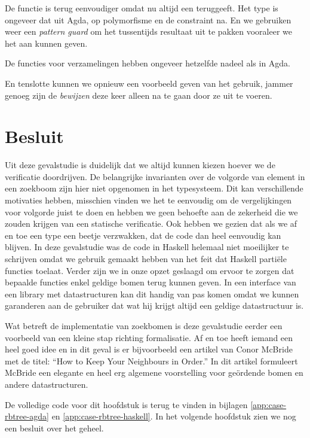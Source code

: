 De  functie is terug eenvoudiger omdat  nu altijd een
 teruggeeft. Het type is ongeveer dat uit Agda, op polymorfisme
en de  constraint na. En we gebruiken weer een \emph{pattern guard} om het
tussentijds resultaat uit te pakken vooraleer we het aan  kunnen
geven.


De functies voor verzamelingen hebben ongeveer hetzelfde nadeel als in Agda.


En tenslotte kunnen we opnieuw een voorbeeld geven van het gebruik, jammer
genoeg zijn de \emph{bewijzen} deze keer alleen na te gaan door ze uit te
voeren.



\section{Besluit}

Uit deze gevalstudie is duidelijk dat we altijd kunnen kiezen hoever we de
verificatie doordrijven. De belangrijke invarianten over de volgorde van
element in een zoekboom zijn hier niet opgenomen in het typesysteem. Dit kan
verschillende motivaties hebben, misschien vinden we het te eenvoudig om de
vergelijkingen voor volgorde juist te doen en hebben we geen behoefte aan de
zekerheid die we zouden krijgen van een statische verificatie. Ook hebben we
gezien dat als we af en toe een type een beetje verzwakken, dat de code dan heel
eenvoudig kan blijven. In deze gevalstudie was de code in Haskell helemaal niet
moeilijker te schrijven omdat we gebruik gemaakt hebben van het feit dat
Haskell partiële functies toelaat. Verder zijn we in onze opzet geslaagd om
ervoor te zorgen dat bepaalde functies enkel geldige bomen terug kunnen geven.
In een interface van een library met datastructuren kan dit handig van pas
komen omdat we kunnen garanderen aan de gebruiker dat wat hij krijgt altijd een
geldige datastructuur is.

Wat betreft de implementatie van zoekbomen is deze gevalstudie eerder een
voorbeeld van een kleine stap richting formalisatie. Af en toe heeft iemand een
heel goed idee en in dit geval is er bijvoorbeeld een artikel van Conor
McBride \cite{hkynio} met de titel: ``How to Keep Your Neighbours in Order.''
In dit artikel formuleert McBride een elegante en heel erg algemene
voorstelling voor geördende bomen en andere datastructuren.

De volledige code voor dit hoofdstuk is terug te vinden in bijlagen
\ref{app:case-rbtree-agda} en \ref{app:case-rbtree-haskell}.
In het volgende hoofdstuk zien we nog een besluit over het geheel.
